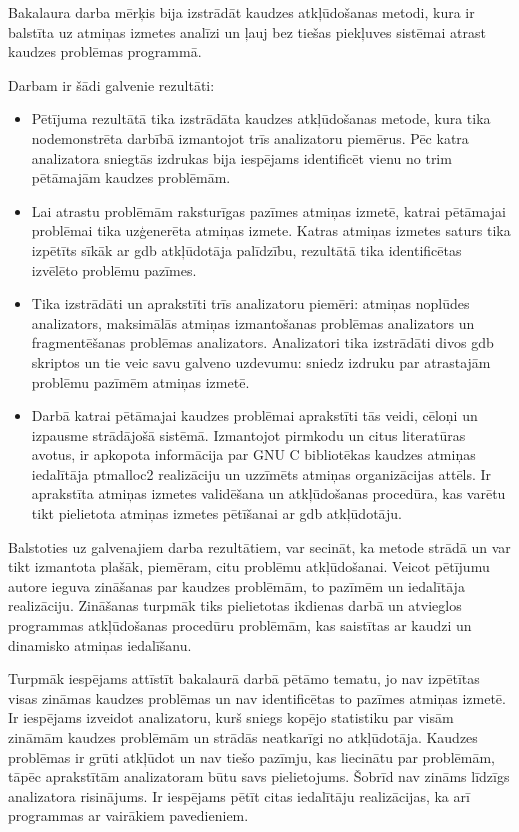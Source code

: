 ﻿Bakalaura darba mērķis bija izstrādāt kaudzes atkļūdošanas metodi, kura ir balstīta uz atmiņas izmetes analīzi un ļauj bez tiešas piekļuves sistēmai atrast kaudzes problēmas programmā.

Darbam ir šādi galvenie rezultāti:
\begin{itemize}
    \item Pētījuma rezultātā tika izstrādāta kaudzes atkļūdošanas metode, kura tika nodemonstrēta darbībā izmantojot trīs analizatoru piemērus.
    Pēc katra analizatora sniegtās izdrukas bija iespējams identificēt vienu no trim pētāmajām kaudzes problēmām.
    \item Lai atrastu problēmām raksturīgas pazīmes atmiņas izmetē, katrai pētāmajai problēmai tika uzģenerēta atmiņas izmete.
    Katras atmiņas izmetes saturs tika izpētīts sīkāk ar gdb atkļūdotāja palīdzību, rezultātā tika identificētas izvēlēto problēmu pazīmes.
    \item Tika izstrādāti un aprakstīti trīs analizatoru piemēri: atmiņas noplūdes analizators, maksimālās atmiņas izmantošanas problēmas analizators un fragmentēšanas problēmas analizators.
    Analizatori tika izstrādāti divos gdb skriptos un tie veic savu galveno uzdevumu: sniedz izdruku par atrastajām problēmu pazīmēm atmiņas izmetē. 
    \item Darbā katrai pētāmajai kaudzes problēmai aprakstīti tās veidi, cēloņi un izpausme strādājošā sistēmā. 
    Izmantojot pirmkodu un citus literatūras avotus, ir apkopota informācija par GNU C bibliotēkas kaudzes atmiņas iedalītāja ptmalloc2 realizāciju un uzzīmēts atmiņas organizācijas attēls. 
    Ir aprakstīta atmiņas izmetes validēšana un atkļūdošanas procedūra, kas varētu tikt pielietota atmiņas izmetes pētīšanai ar gdb atkļūdotāju.
\end{itemize}

Balstoties uz galvenajiem darba rezultātiem, var secināt, ka metode strādā un var tikt izmantota plašāk, piemēram, citu problēmu atkļūdošanai.
Veicot pētījumu autore ieguva zināšanas par kaudzes problēmām, to pazīmēm un iedalītāja realizāciju.
Zināšanas turpmāk tiks pielietotas ikdienas darbā un atvieglos programmas atkļūdošanas procedūru problēmām, kas saistītas ar kaudzi un dinamisko atmiņas iedalīšanu. 

Turpmāk iespējams attīstīt bakalaurā darbā pētāmo tematu, jo nav izpētītas visas zināmas kaudzes problēmas un nav identificētas to pazīmes atmiņas izmetē.
Ir iespējams izveidot analizatoru, kurš sniegs kopējo statistiku par visām zināmām kaudzes problēmām un strādās neatkarīgi no atkļūdotāja. 
Kaudzes problēmas ir grūti atkļūdot un nav tiešo pazīmju, kas liecinātu par problēmām, tāpēc aprakstītām analizatoram būtu savs pielietojums.
Šobrīd nav zināms līdzīgs analizatora risinājums. Ir iespējams pētīt citas iedalītāju realizācijas, ka arī programmas ar vairākiem pavedieniem.
